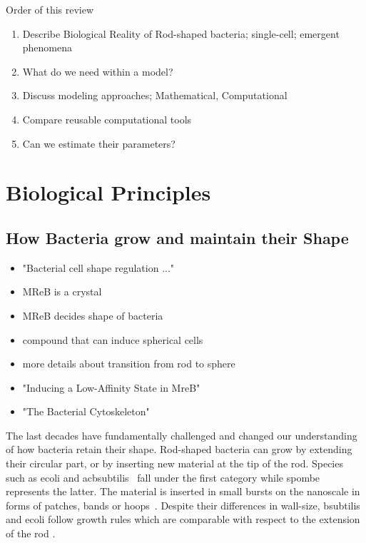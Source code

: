 \documentclass{article}
\begin{document}
Order of this review
\begin{enumerate}
    \item Describe Biological Reality of Rod-shaped bacteria; single-cell; emergent phenomena
    \item What do we need within a model?
    \item Discuss modeling approaches; Mathematical, Computational
    \item Compare reusable computational tools
    \item Can we estimate their parameters?
\end{enumerate}

\section{Biological Principles}
\subsection{How Bacteria grow and maintain their Shape}

\begin{itemize}
    \item \cite{Lleo1990} "Bacterial cell shape regulation ..."
    \item \cite{Gitai2005} MReB is a crystal
    \item \cite{Bratton2018} MReB decides shape of bacteria
    \item \cite{IWAI2002} compound that can induce spherical cells
    \item \cite{Karczmarek2007} more details about transition from rod to sphere
    \item \cite{Bean2009} "Inducing a Low-Affinity State in MreB"
    \item \cite{Ausmees2003} "The Bacterial Cytoskeleton"
\end{itemize}

The last decades have fundamentally challenged and changed our understanding of how bacteria retain
their shape.
Rod-shaped bacteria can grow by extending their circular part, or by inserting new material
at the tip of the rod.
Species such as \ac{ecoli} and ac{bsubtilis}~\cite{Errington2020} fall under the first category
while \ac{spombe} represents the latter.
The material is inserted in small bursts on the nanoscale in forms of patches, bands or
hoops~\cite{DePedro2003}.
Despite their differences in wall-size, \ac{bsubtilis} and \ac{ecoli} follow growth rules which are
comparable with respect to the extension of the rod \cite{Chang2014}.
\end{document}
